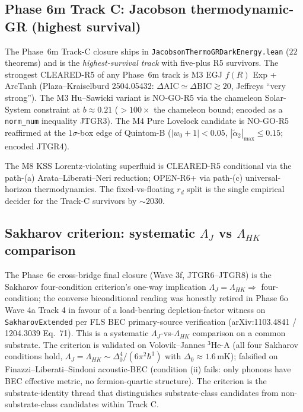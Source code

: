 \documentclass[aps,prd,reprint,nofootinbib,superscriptaddress]{revtex4-2}
\begin{document}
\subsection{Phase 6m Track C: Jacobson thermodynamic-GR (highest survival)}

The Phase~6m Track-C closure ships in
\texttt{JacobsonThermoGRDarkEnergy.lean} ($22$ theorems) and is the
\emph{highest-survival track} with five-plus R5 survivors. The strongest
CLEARED-R5 of any Phase~6m track is M3 EGJ $f(R)$ Exp + ArcTanh
(Plaza--Kraiselburd 2504.05432: $\Delta\!\mathrm{AIC} \simeq
\Delta\!\mathrm{BIC} \gtrsim 20$, Jeffreys ``very strong''). The
M3 Hu--Sawicki variant is NO-GO-R5 via the chameleon Solar-System
constraint at $b \approx 0.21$ ($> 100\times$ the chameleon bound;
encoded as a \texttt{norm\_num} inequality JTGR3). The M4 Pure
Lovelock candidate is NO-GO-R5 reaffirmed at the $1\sigma$-box edge
of Quintom-B ($|w_0+1| < 0.05$, $|\tilde\alpha_2|_{\max}\le 0.15$;
encoded JTGR4).

The M8 KSS Lorentz-violating superfluid is CLEARED-R5 conditional
via the path-(a) Arata--Liberati--Neri reduction; OPEN-R6+ via
path-(c) universal-horizon thermodynamics. The fixed-vs-floating
$r_d$ split is the single empirical decider for the Track-C survivors
by $\sim 2030$.

\subsection{Sakharov criterion: systematic $\Lambda_J$ vs $\Lambda_{HK}$ comparison}

The Phase~6e cross-bridge final closure (Wave 3f, JTGR6--JTGR8) is
the Sakharov four-condition criterion's one-way implication
$\Lambda_J = \Lambda_{HK} \Rightarrow$ four-condition; the converse
biconditional reading was honestly retired in Phase 6o Wave 4a Track 4
in favour of a load-bearing depletion-factor witness on
\texttt{SakharovExtended} per FLS BEC primary-source verification
(arXiv:1103.4841 / 1204.3039 Eq.~71). This is a systematic
$\Lambda_J$-vs-$\Lambda_{HK}$ comparison on a common substrate.
The criterion is validated on Volovik--Jannes
${}^3\mathrm{He}$-A (all four Sakharov conditions hold, $\Lambda_J =
\Lambda_{HK} \sim \Delta_0^4/(6\pi^2 \hbar^3)$ with $\Delta_0
\approx 1.6\,\mathrm{mK}$); falsified on Finazzi--Liberati--Sindoni
acoustic-BEC (condition (ii) fails: only phonons have BEC effective
metric, no fermion-quartic structure). The criterion is the
substrate-identity thread that distinguishes substrate-class
candidates from non-substrate-class candidates within Track C.
\end{document}
